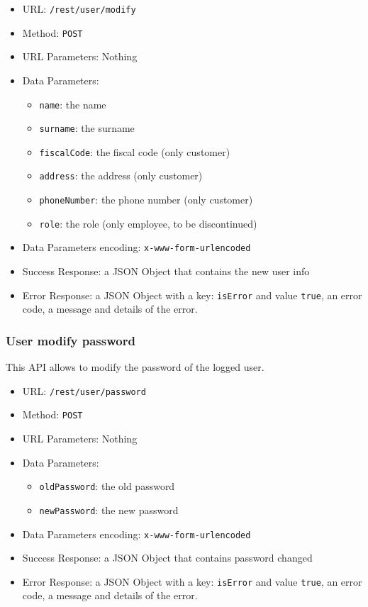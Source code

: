 \begin{itemize}
    \item URL: \texttt{/rest/user/modify}
    \item Method: \texttt{POST}
    \item URL Parameters: Nothing
    \item Data Parameters:
    \begin{itemize}
        \item \texttt{name}: the name
        \item \texttt{surname}: the surname
        \item \texttt{fiscalCode}: the fiscal code (only customer)
        \item \texttt{address}: the address (only customer)
        \item \texttt{phoneNumber}: the phone number (only customer)
        \item \texttt{role}: the role (only employee, to be discontinued)
    \end{itemize}
    \item Data Parameters encoding: \texttt{x-www-form-urlencoded}
    \item Success Response: a JSON Object that contains the new user info
    \item Error Response: a JSON Object with a key: \texttt{isError}  and value \texttt{true}, an error code, a message and details of the error.
\end{itemize}

\subsubsection*{User modify password}

This API allows to modify the password of the logged user.

\begin{itemize}
    \item URL: \texttt{/rest/user/password}
    \item Method: \texttt{POST}
    \item URL Parameters: Nothing
    \item Data Parameters:
    \begin{itemize}
        \item \texttt{oldPassword}: the old password
        \item \texttt{newPassword}: the new password
    \end{itemize}
    \item Data Parameters encoding: \texttt{x-www-form-urlencoded}
    \item Success Response: a JSON Object that contains password changed
    \item Error Response: a JSON Object with a key: \texttt{isError}  and value \texttt{true}, an error code, a message and details of the error.
\end{itemize}


